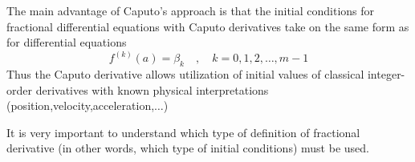 The main advantage of Caputo's approach is that the initial conditions for 
fractional differential equations with Caputo derivatives take on the same 
form as for differential equations
\[
    f^{(k)}(a) = \beta_k \quad,\quad k=0,1,2,\dots,m-1 
\]
Thus the Caputo derivative allows utilization of initial values 
of classical integer-order derivatives with known physical
interpretations (position,velocity,acceleration,$\dots$)

It is very important to understand which type of definition of fractional derivative 
(in other words, which type of initial conditions) must be used.



